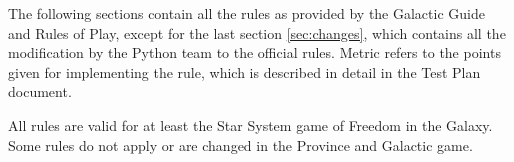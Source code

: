 \documentclass[a4wide]{article}
\newcounter{rc}
\begin{document}
The following sections contain all the rules as provided by the Galactic Guide and Rules of Play, except for the last section \ref{sec:changes}, which contains all the modification by the Python team to the official rules. Metric refers to the points given for implementing the rule, which is described in detail in the Test Plan document.

All rules are valid for at least the Star System game of Freedom in the Galaxy. Some rules do not apply or are changed in the Province and Galactic game.

\newcommand{\first}{.5cm}
\newcommand{\second}{11.0cm}
\newcommand{\third}{2.5cm}
\newcommand{\fourth}{1.5cm}
































\end{document}
